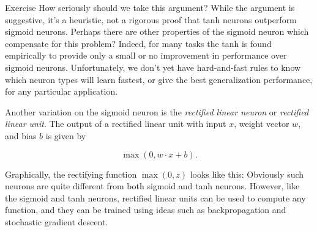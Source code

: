 \begin{exerciseBox}{Exercise}
How seriously should we take this argument? While the argument is suggestive, it's a heuristic, not a rigorous proof that tanh neurons outperform sigmoid neurons. Perhaps there are other properties of the sigmoid neuron which compensate for this problem? Indeed, for many tasks the tanh is found empirically to provide only a small or no improvement in performance over sigmoid neurons. Unfortunately, we don't yet have hard-and-fast rules to know which neuron types will learn fastest, or give the best generalization performance, for any particular application.


Another variation on the sigmoid neuron is the \emph{rectified linear neuron} or \emph{rectified linear unit}. The output of a rectified linear unit with input $x$, weight vector $w$, and bias $b$ is given by

\begin{equation}
\max(0, w \cdot x+b).
\tag{112}
\end{equation}

\noindent Graphically, the rectifying function $\max(0, z)$ looks like this: Obviously such neurons are quite different from both sigmoid and tanh neurons. However, like the sigmoid and tanh neurons, rectified linear units can be used to compute any function, and they can be trained using ideas such as backpropagation and stochastic gradient descent.



\end{exerciseBox}
